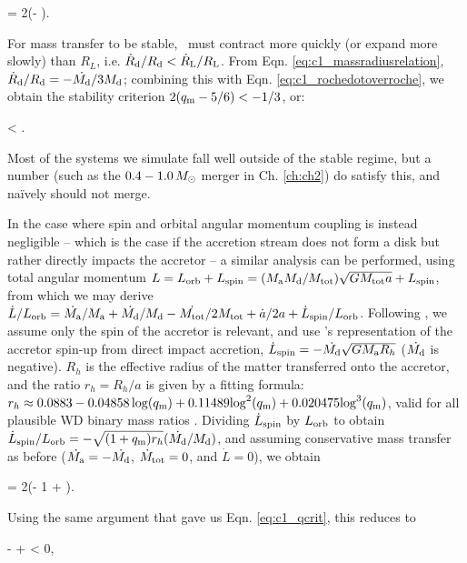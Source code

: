 \eqbegin
{} = 2(\qm- )\frac{\dot{\Md}}{\Md}.
\label{eq:c1_rochedotoverroche}
\eqend

\noindent For mass transfer to be stable, \Rd\ must contract more quickly (or expand more slowly) than $R_L$, i.e. $\dot{R}_\mrm{d}/\Rd < \dot{R}_\mrm{L}/R_\mrm{L}$.  From Eqn. \ref{eq:c1_massradiusrelation}, $\dot{R}_\mrm{d}/\Rd = -\dot{\Md}/3\Md$; combining this with Eqn. \ref{eq:c1_rochedotoverroche}, we obtain the stability criterion $2(\qm- 5/6) < -1/3$, or:

\eqbegin
\qm < .
\label{eq:c1_qcrit}
\eqend

\noindent Most of the systems we simulate fall well outside of the stable regime, but a number (such as the $0.4 - 1.0\,\Msun$ merger in Ch. \ref{ch:ch2}) do satisfy this, and na\"{i}vely should not merge.

In the case where spin and orbital angular momentum coupling is instead negligible -- which is the case if the accretion stream does not form a disk but rather directly impacts the accretor \citep{nele+01} -- a similar analysis can be performed, using total angular momentum $L = L_\mrm{orb} + L_\mrm{spin} = (\Ma\Md/\Mtot)\sqrt{G\Mtot a} + L_\mrm{spin}$, from which we may derive $\dot{L}/L_\mrm{orb} = \dot{\Ma}/\Ma + \dot{\Md}/\Md - \dot{\Mtot}/2\Mtot + \dot{a}/2a + \dot{L}_\mrm{spin}/L_\mrm{orb}$.  Following \cite{marsns04}, we assume only the spin of the accretor is relevant, and use \cite{verbr88}'s representation of the accretor spin-up from direct impact accretion, $\dot{L}_\mrm{spin} = -\dot{\Md}\sqrt{G\Ma R_h}$ ($\dot{\Md}$ is negative).  $R_h$ is the effective radius of the matter transferred onto the accretor, and the ratio $r_h = R_h/a$ is given by a fitting formula: $r_h \approx 0.0883 - 0.04858\log(\qm) + 0.11489{\log}^2(\qm) + 0.020475{\log}^3(\qm)$, valid for all plausible WD binary mass ratios \citep{verbr88}.  Dividing $\dot{L}_\mathrm{spin}$ by $L_\mathrm{orb}$ to obtain $\dot{L}_\mrm{spin}/L_\mrm{orb} = -\sqrt{(1 + \qm)r_h}(\dot{\Md}/\Md)$, and assuming conservative mass transfer {\charles as before ($\dot{\Ma} = -\dot{\Md}$, $\dot{M}_\mathrm{tot} = 0$, and $\dot{L} = 0$)}, we obtain

\eqbegin
{} = 2\left(\qm- 1 + \right)\frac{\dot{\Md}}{\Md}.
\label{eq:c1_adotovera2}
\eqend

\noindent Using the same argument that gave us Eqn. \ref{eq:c1_qcrit}, this reduces to

\eqbegin
\qm-  +  < 0,
\label{eq:c1_qcrit2}
\eqend

